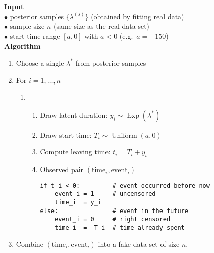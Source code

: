 \begin{tcolorbox}[
  title   = \textbf{Algorithm --Simulating a Fake Survival Dataset (e.g. Posterior predictive model checking)},
   fonttitle  = \small, 
  colback = white,
  colframe= black,
  breakable ]
\textbf{Input}\\
\quad$\bullet$ posterior samples $\{\lambda^{(s)}\}$ \hfill (obtained by fitting real data)\\
\quad$\bullet$ sample size $n$ \hfill (same size as the real data set)\\
\quad$\bullet$ start‑time range $[a,0]$ with $a<0$ \hfill (e.g.\ $a=-150$)\\[6pt]

\textbf{Algorithm}\par
\begin{enumerate}
  \item Choose a single $\lambda^\ast$ from posterior samples 
  \item For $i = 1,\dots,n$
        \begin{enumerate}
          \item[] \hspace*{-10pt}%
          \begin{minipage}[t]{\linewidth}
          \begin{enumerate}
            \item Draw latent duration: $y_i \sim \operatorname{Exp}(\lambda^\ast)$
            \item Draw start time: $T_i \sim \operatorname{Uniform}(a,0)$
            \item Compute leaving time: $t_i = T_i + y_i$
            \item Observed pair $(\text{time}_i,\text{event}_i)$
                  \begin{lstlisting}[numbers=none,frame=none]
if t_i < 0:         # event occurred before now
    event_i = 1     # uncensored
    time_i  = y_i
else:               # event in the future
    event_i = 0     # right censored
    time_i  = -T_i  # time already spent
\end{lstlisting}
          \end{enumerate}
          \end{minipage}
        \end{enumerate}
  \item Combine $(\text{time}_i,\text{event}_i)$ into a fake data set of size $n$.
\end{enumerate}
\end{tcolorbox}


